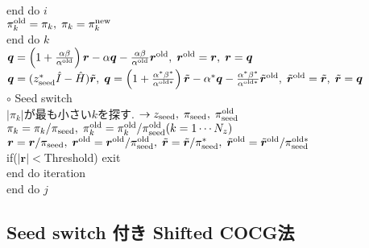 \documentclass[12pt,titlepage]{jarticle}
\begin{document}
\\\hspace{1.5cm}
end do $i$
\\\hspace{1.5cm}
$\pi_k^{\rm old} = \pi_k,\; \pi_k = \pi_k^{\rm new}$
\\\hspace{1.0cm}
end do $k$
\\\hspace{1.0cm}
${\boldsymbol q} = \left( 1 + \frac{\alpha \beta}{\alpha^{\rm old}} \right) {\boldsymbol r}
- \alpha {\boldsymbol q} - \frac{\alpha \beta}{\alpha^{\rm old}} {\boldsymbol r}^{\rm old},\; 
{\boldsymbol r}^{\rm old} = {\boldsymbol r},\; {\boldsymbol r} = {\boldsymbol q}$
\\\hspace{1.0cm}
${\boldsymbol q} = (z_{\rm seed}^* {\hat I} - {\hat H}) {\tilde {\boldsymbol r}},\;
{\boldsymbol q} = \left( 1 + \frac{\alpha^* \beta^*}{\alpha^{{\rm old} *}} \right) {\tilde {\boldsymbol r}}
- \alpha^* {\boldsymbol q} - \frac{\alpha^* \beta^*}{\alpha^{{\rm old} *}} {\tilde {\boldsymbol r}}^{\rm old},\; 
{\tilde {\boldsymbol r}}^{\rm old} = {\tilde {\boldsymbol r}},\; {\tilde {\boldsymbol r}} = {\boldsymbol q}$
\\\hspace{1.0cm}
$\circ$ Seed switch
\\\hspace{1.0cm}
$|\pi_k|$が最も小さい$k$を探す. $\rightarrow z_{\rm seed},\; \pi_{\rm seed},\; \pi_{\rm seed}^{\rm old} $
\\\hspace{1.0cm}
$\pi_k = \pi_k /\pi_{\rm seed},\; \pi_k^{\rm old} = \pi_k^{\rm old} / \pi_{\rm seed}^{\rm old} (k=1 \cdots N_z)$
\\\hspace{1.0cm}
${\boldsymbol r} = {\boldsymbol r} / \pi_{\rm seed},\; {\boldsymbol r}^{\rm old} = {\boldsymbol r}^{\rm old} / \pi_{\rm seed}^{\rm old},\; 
{\tilde {\boldsymbol r}} = {\tilde {\boldsymbol r}} / \pi_{\rm seed}^*,\; 
{\tilde {\boldsymbol r}}^{\rm old} = {\tilde {\boldsymbol r}}^{\rm old} / \pi_{\rm seed}^{{\rm old} *}$
\\\hspace{1.0cm}
if($|{\boldsymbol r}| < $Threshold) exit
\\\hspace{0.5cm}
end do iteration
\\
end do $j$

\subsection{Seed switch 付き Shifted COCG法}
\end{document}
